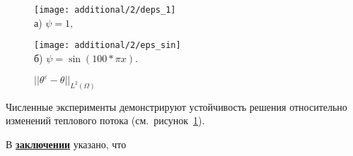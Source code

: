 \begin{figure}[h!t]
    \begin{minipage}[b][][b]{0.49\linewidth}
        \centering
        \texttt{[image: additional/2/deps\_1]}\\ а) $\psi = 1,$
    \end{minipage}
    \hfill
    \begin{minipage}[b][][b]{0.49\linewidth}
        \centering
        \texttt{[image: additional/2/eps\_sin]} \\ б) $\psi = \sin (100 * \pi x)$.
    \end{minipage}
    \caption{$||\theta^\varepsilon - \theta||_{L^2(\Omega)}$}
    \label{fig:4_4:vareps}
\end{figure}

Численные эксперименты демонстрируют
устойчивость решения относительно изменений теплового
потока (см.\ рисунок~\ref{fig:4_4:vareps}).


\FloatBarrier
{}                                  %
В \underline{\textbf{заключении}} указано, что


